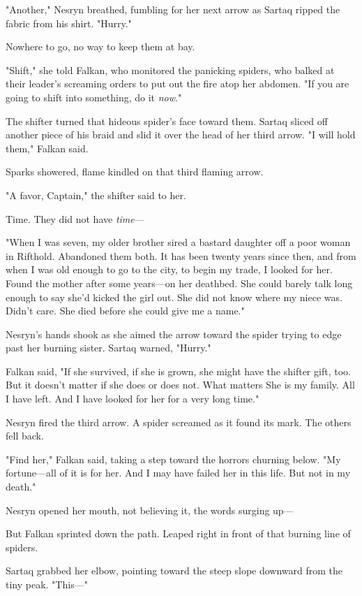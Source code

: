"Another," Nesryn breathed, fumbling for her next arrow as Sartaq ripped the fabric from his shirt. "Hurry."

Nowhere to go, no way to keep them at bay.

"Shift," she told Falkan, who monitored the panicking spiders, who balked at their leader's screaming orders to put out the fire atop her abdomen. "If you are going to shift into something, do it \emph{now}."

The shifter turned that hideous spider's face toward them. Sartaq sliced off another piece of his braid and slid it over the head of her third arrow. "I will hold them," Falkan said.

Sparks showered, flame kindled on that third flaming arrow.

"A favor, Captain," the shifter said to her.

Time. They did not have \emph{time}---

"When I was seven, my older brother sired a bastard daughter off a poor woman in Rifthold. Abandoned them both. It has been twenty years since then, and from when I was old enough to go to the city, to begin my trade, I looked for her. Found the mother after some years---on her deathbed. She could barely talk long enough to say she'd kicked the girl out. She did not know where my niece was. Didn't care. She died before she could give me a name."

Nesryn's hands shook as she aimed the arrow toward the spider trying to edge past her burning sister. Sartaq warned, "Hurry."

Falkan said, "If she survived, if she is grown, she might have the shifter gift, too. But it doesn't matter if she does or does not. What matters  She is my family. All I have left. And I have looked for her for a very long time."

Nesryn fired the third arrow. A spider screamed as it found its mark. The others fell back.

"Find her," Falkan said, taking a step toward the horrors churning below. "My fortune---all of it is for her. And I may have failed her in this life. But not in my death."

Nesryn opened her mouth, not believing it, the words surging up---

But Falkan sprinted down the path. Leaped right in front of that burning line of spiders.

Sartaq grabbed her elbow, pointing toward the steep slope downward from the tiny peak. "This---"

